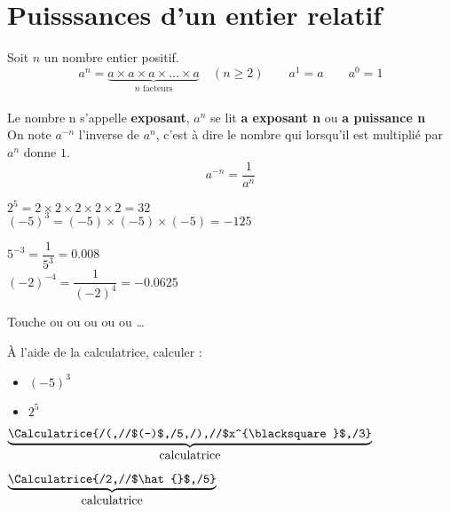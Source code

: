 \section{Puisssances d'un entier relatif}
\begin{definition}
    Soit $n$ un nombre entier positif.
$$a^n=\underbrace{a\times a\times a\times\dots\times a}_{n\mbox{ facteurs}}\quad (n\geq 2)\qquad a^1=a\qquad a^0=1$$
\\ Le nombre n s'appelle \textbf{exposant}, $a^n$ se lit \textbf{a exposant n} ou \textbf{a puissance n}
\\ On note $a^{-n}$ l'inverse de $a^n$, c'est \`{a} dire le nombre qui lorsqu'il est multipli\'e par $a^n$ donne $1$. 
$$a^{-n}=\frac1{a^n}$$
\end{definition}

\begin{exemples*1}
    \begin{minipage}{0.5\linewidth}
        $2^5=2\times2\times2\times2\times2=32$ \\
        $(-5)^3=(-5)\times(-5)\times(-5)=-125$
    \end{minipage}
    \begin{minipage}{0.5\linewidth}
        $5^{-3}=\dfrac1{5^3}=\num{0.008}$ \\\smallskip
        $(-2)^{-4}=\dfrac1{(-2)^4}=\num{-0.0625}$
    \end{minipage}
\end{exemples*1}

\begin{methode}
    Touche  ou  ou  ou \Calculatrice{//$\hat{}$} ou \Calculatrice{//$\uparrow$} ou \dots
    \exercice

    À l'aide de la calculatrice, calculer :
    \begin{itemize}
        \item $(-5)^3$
        \item $2^5$
    \end{itemize}
    \correction

    $\underbrace{\Calculatrice{/(,//$(-)$,/5,/),//$x^{\blacksquare}$,/3}}_{\mbox{calculatrice}}$

    \smallskip

    \bigskip
    $\underbrace{\Calculatrice{/2,//$\hat{}$,/5}}_{\mbox{calculatrice}}$

    \smallskip

\end{methode}

